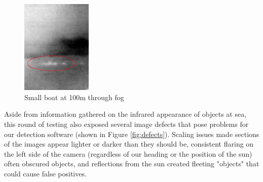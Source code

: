 \begin{figure}
\centering
\includegraphics[width=0.3\textwidth]{"./image/shore_fog_circled"}
\caption{Small boat at 100m through fog}
\label{fig:shore_fog}
\end{figure}

Aside from information gathered on the infrared appearance of objects at sea, this round of testing also exposed several image defects that pose problems for our detection software (shown in Figure \ref{fig:defects}). Scaling issues made sections of the images appear lighter or darker than they should be, consistent flaring on the left side of the camera (regardless of our heading or the position of the sun) often obscured objects, and reflections from the sun created fleeting "objects" that could cause false positives. 

